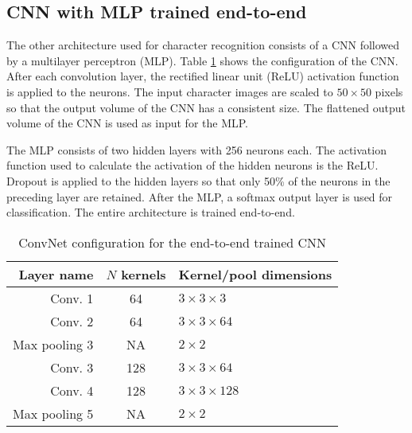 \subsection{CNN with MLP trained end-to-end}
\label{sec:hmdcnn}

The other architecture used for character recognition consists of a CNN followed by a multilayer perceptron (MLP). Table \ref{tab:hmdcnnconf} shows the configuration of the CNN. After each convolution layer, the rectified linear unit (ReLU) activation function is applied to the neurons. The input character images are scaled to $50 \times 50$ pixels so that the output volume of the CNN has a consistent size. The flattened output volume of the CNN is used as input for the MLP. 

The MLP consists of two hidden layers with 256 neurons each. The activation function used to calculate the activation of the hidden neurons is the ReLU. Dropout is applied to the hidden layers so that only 50\% of the neurons in the preceding layer are retained. After the MLP, a softmax output layer is used for classification. The entire architecture is trained end-to-end. 

\begin{table}
\renewcommand{\arraystretch}{1.3}
\centering
\caption{ConvNet configuration for the end-to-end trained CNN}
\begin{tabular}{r|cl}\hline
Layer name & $N$ kernels & Kernel/pool dimensions \\ \hline \hline
Conv. 1 & 64 & $3 \times 3 \times 3$  \\
Conv. 2 & 64 & $3 \times 3 \times 64$ \\
Max pooling 3 & NA & $2\times 2$ \\
Conv. 3 & 128 & $3 \times 3 \times 64$ \\
Conv. 4 & 128 & $3 \times 3 \times 128$ \\
Max pooling 5 & NA & $2\times 2$ \\ \hline
\end{tabular}
\label{tab:hmdcnnconf}
\end{table}
